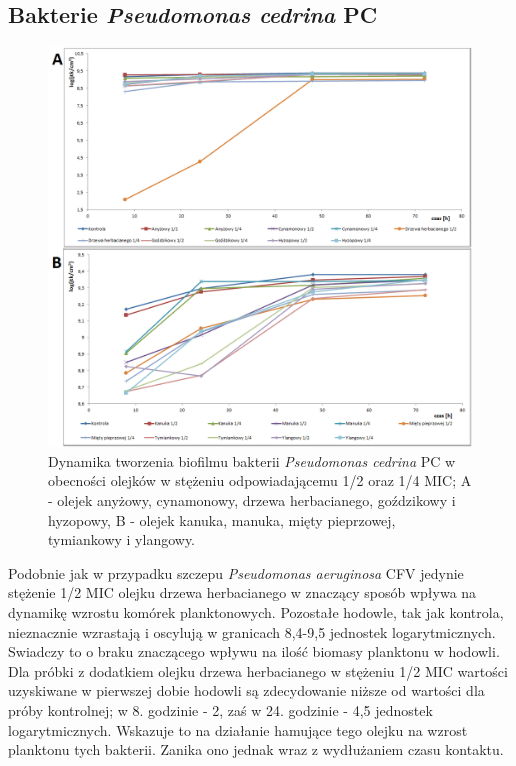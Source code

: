 \documentclass[11pt,a4paper]{report}
\begin{document}
\clearpage

\subsection{Bakterie \textit{Pseudomonas cedrina} PC}
\begin{figure}[!h]
\begin{center}
\includegraphics[scale=0.55]{img/pc-c.png}
\caption{Dynamika tworzenia biofilmu bakterii \textit{Pseudomonas cedrina} PC w obecności olejków w stężeniu odpowiadającemu 1/2 oraz 1/4 MIC; A - olejek anyżowy, cynamonowy, drzewa herbacianego, goździkowy i hyzopowy, B - olejek kanuka, manuka, mięty pieprzowej, tymiankowy i ylangowy.}\label{pc-c}
\end{center} 
\end{figure}

\clearpage
Podobnie jak w przypadku szczepu \textit{Pseudomonas aeruginosa} CFV jedynie stężenie 1/2 MIC olejku drzewa herbacianego w znaczący sposób wpływa na dynamikę wzrostu komórek planktonowych. Pozostałe hodowle, tak jak kontrola, nieznacznie wzrastają i oscylują w granicach 8,4-9,5 jednostek logarytmicznych. Swiadczy to o braku znaczącego wpływu na ilość biomasy planktonu w hodowli.\\
Dla próbki z dodatkiem olejku drzewa herbacianego w stężeniu 1/2 MIC wartości uzyskiwane w pierwszej dobie hodowli są zdecydowanie niższe od wartości dla próby kontrolnej; w 8. godzinie - 2, zaś w 24. godzinie - 4,5 jednostek logarytmicznych. Wskazuje to na działanie hamujące tego olejku na wzrost planktonu tych bakterii. Zanika ono jednak wraz z wydłużaniem czasu kontaktu.
\end{document}
